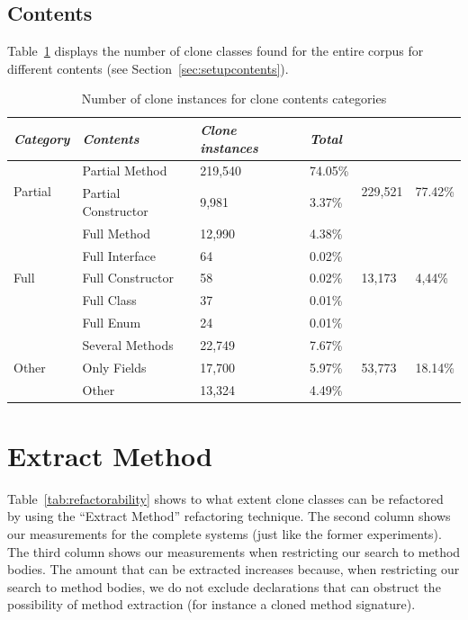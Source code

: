 \subsection{Contents}
Table~\ref{tab:contents} displays the number of clone classes found for the entire corpus for different contents (see Section~\ref{sec:setupcontents}).

\begin{table}[H]
\centering
\begin{tabular}{@{}llllll@{}}
\toprule
\textit{\textbf{Category}} & \textit{\textbf{Contents}} & \textit{\textbf{Clone instances}} & \textit{\textbf{Total}} \\ \midrule
\multirow{2}{*}{Partial} & Partial Method & 219,540 & 74.05\% & \multirow{2}{*}{229,521}& \multirow{2}{*}{77.42\%} \\ \cmidrule(lr){2-4}
 & Partial Constructor & 9,981 & 3.37\% & & \\ \midrule
\multirow{5}{*}{Full} & Full Method & 12,990 & 4.38\% & \multirow{5}{*}{13,173}& \multirow{5}{*}{4,44\%} \\ \cmidrule(lr){2-4}
 & Full Interface & 64 & 0.02\% & & \\ \cmidrule(lr){2-4}
 & Full Constructor & 58 & 0.02\% & & \\ \cmidrule(lr){2-4}
 & Full Class & 37 & 0.01\% & & \\ \cmidrule(lr){2-4}
 & Full Enum & 24 & 0.01\% & & \\ \midrule
\multirow{3}{*}{Other} & Several Methods & 22,749 & 7.67\% & \multirow{3}{*}{53,773} & \multirow{3}{*}{18.14\%} \\ \cmidrule(lr){2-4}
 & Only Fields & 17,700 & 5.97\% & & \\ \cmidrule(lr){2-4}
 & Other & 13,324 & 4.49\% & & \\ \bottomrule
\end{tabular}
\caption{Number of clone instances for clone contents categories}
\label{tab:contents}
\end{table}

\section{Extract Method}
Table~\ref{tab:refactorability} shows to what extent clone classes can be refactored by using the ``Extract Method'' refactoring technique. The second column shows our measurements for the complete systems (just like the former experiments). The third column shows our measurements when restricting our search to method bodies. The amount that can be extracted increases because, when restricting our search to method bodies, we do not exclude declarations that can obstruct the possibility of method extraction (for instance a cloned method signature).

